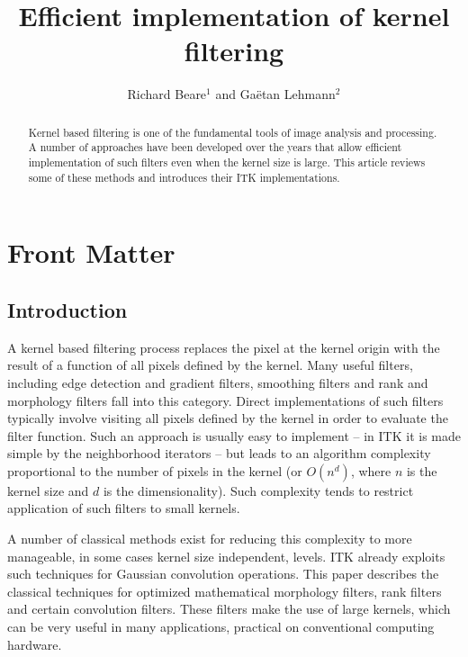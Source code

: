\documentclass[a4paper]{InsightArticle}
\title{Efficient implementation of kernel filtering}
\author{Richard Beare{$^1$} {\small{and}} Ga\"etan Lehmann{$^2$}}
\begin{document}
\maketitle

\ifhtml
\chapter*{Front Matter\label{front}}
\fi


\begin{abstract}
\noindent
Kernel based filtering is one of the fundamental tools of image
analysis and processing. A number of approaches have been developed
over the years that allow efficient implementation of such filters
even when the kernel size is large. This article reviews some of these
methods and introduces their ITK implementations.
\end{abstract}

\tableofcontents

\section{Introduction}
A kernel based filtering process replaces the pixel at the kernel
origin with the result of a function of all pixels defined by
the kernel. Many useful filters, including edge detection and gradient
filters, smoothing filters and rank and morphology filters fall into
this category. Direct implementations of such filters typically
involve visiting all pixels defined by the kernel in order to evaluate
the filter function. Such an approach is usually easy to implement
-- in ITK it is made simple by the neighborhood iterators -- but leads
to an algorithm complexity proportional to the number of pixels in the
kernel (or $O(n^d)$, where $n$ is the kernel size and $d$ is the
dimensionality). Such complexity tends to restrict application of such
filters to small kernels.

A number of classical methods exist for reducing this complexity to
more manageable, in some cases kernel size independent, levels. ITK
already exploits such techniques for Gaussian convolution
operations. This paper describes the classical techniques for
optimized mathematical morphology filters, rank filters and certain
convolution filters. These filters make the use of large kernels,
which can be very useful in many applications, practical on
conventional computing hardware.
\end{document}
